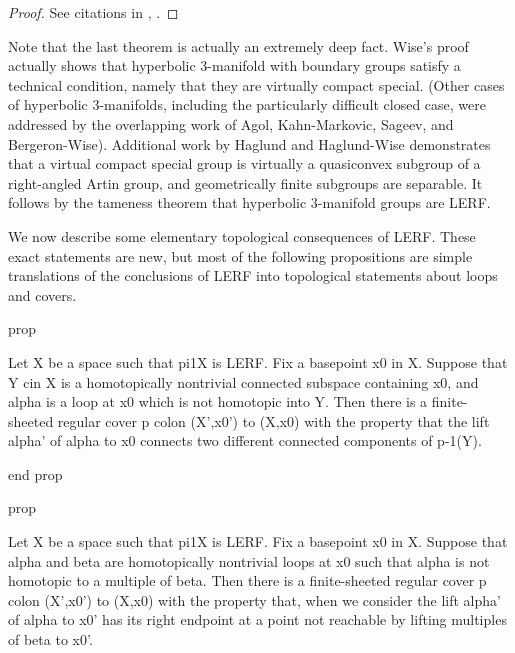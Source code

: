 \begin{proof}

See citations in \cite{LR}, \cite{AFW}.

\end{proof}

Note that the last theorem is actually an extremely deep fact. Wise's proof
actually shows that hyperbolic 3-manifold with boundary groups satisfy
a technical condition, namely that they are virtually compact special. (Other
cases of hyperbolic 3-manifolds, including the particularly difficult closed
case, were addressed by the overlapping work of Agol, Kahn-Markovic, Sageev,
and Bergeron-Wise).  Additional work by Haglund and Haglund-Wise demonstrates
that a virtual compact special group is virtually a quasiconvex subgroup of
a right-angled Artin group, and geometrically finite subgroups are separable.
It follows by the tameness theorem that hyperbolic 3-manifold groups are LERF.

%
%


We now describe some elementary topological consequences of LERF. These exact
statements are new, but most of the following propositions are simple
translations of the conclusions of LERF into topological statements about loops
and covers.

prop

Let X be a space such that pi1X is LERF. Fix a basepoint x0 in X. Suppose that
Y cin X is a homotopically nontrivial connected subspace containing x0, and
alpha is a loop at x0 which is not homotopic into Y. Then there is
a finite-sheeted regular cover p colon (X',x0') to (X,x0) with the property
that the lift alpha' of alpha to x0 connects two different connected components
of p-1(Y).

end prop

prop

Let X be a space such that pi1X is LERF. Fix a basepoint x0 in X. Suppose that
alpha and beta are homotopically nontrivial loops at x0 such that alpha is not
homotopic to a multiple of beta. Then there is a finite-sheeted regular cover
p colon (X',x0') to (X,x0) with the property that, when we consider the lift
alpha' of alpha to x0' has its right endpoint at a point not reachable by
lifting multiples of beta to x0'.

